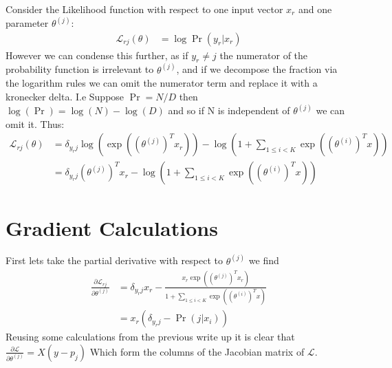 \documentclass[12pt]{article}
\begin{document}
Consider the Likelihood function with respect to one input vector $x_r$
and one parameter $\theta^{(j)}$:
\begin{align*}
    \mathcal{L}_{rj}(\theta) &= \log\Pr(y_r | x_r)  
\end{align*}
However we can condense this further, as if $y_r \neq j$ the numerator of the probability
function is irrelevant to $\theta^{(j)}$, and if we decompose the fraction via the logarithm rules
we can omit the numerator term and replace it with a kronecker delta. I.e Suppose $\Pr = N/D$
then $\log(\Pr) = \log(N) - \log(D)$  and so if N is independent of $\theta^{(j)}$ we can omit it.
Thus:
\begin{align*}
     \mathcal{L}_{rj}(\theta) &= \delta_{{y_r}j}\log(\exp((\theta^{(j)})^Tx_r)) - \log(1 + \displaystyle \sum_{1 \leq i < K}\exp((\theta^{(i)})^Tx)) \\
     &= \delta_{{y_r}j}(\theta^{(j)})^Tx_r - \log(1 + \displaystyle \sum_{1 \leq i < K}\exp((\theta^{(i)})^Tx))
\end{align*}

\section*{Gradient Calculations}
First lets take the partial derivative with respect to $\theta^{(j)}$ we find
\begin{align*}
    \frac{\partial \mathcal{L}_{rj}}{\partial \theta^{(j)}} &= \delta_{y_r j}x_r - \frac{x_r\exp((\theta^{(j)})^Tx_r)}{1 + \displaystyle \sum_{1 \leq i < K}\exp((\theta^{(i)})^Tx)} \\
    &= x_r(\delta_{y_rj} - \Pr(j|x_i))
\end{align*}
Reusing some calculations from the previous write up it is clear that
$\frac{\partial \mathcal{L}}{\partial \theta^{(j)}} = X(y - p_j)$ Which form 
the columns of the Jacobian matrix of $\mathcal{L}$.
\end{document}
